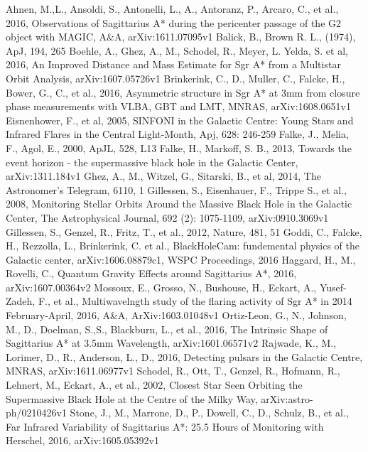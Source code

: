 \documentclass[a4paper,12pt]{article}
\begin{document}
\begin{thebibliography}{1}
Ahnen, M.,L., Ansoldi, S., Antonelli, L., A., Antoranz, P., Arcaro, C., et al., 2016, Observations of Sagittarius A* during the pericenter passage of the G2 object with 
MAGIC, A\&A, arXiv:1611.07095v1
Balick, B., Brown R. L., (1974), ApJ, 194, 265
Boehle, A., Ghez, A., M., Schodel, R., Meyer, L. Yelda, S. et al, 2016, An Improved Distance and Mass Estimate for Sgr A* from a Multistar Orbit Analysis, 
arXiv:1607.05726v1
Brinkerink, C., D., Muller, C., Falcke, H., Bower, G., C., et al., 2016, Asymmetric structure in Sgr A* at 3mm from closure phase measurements with VLBA,
 GBT and LMT, MNRAS, arXiv:1608.0651v1
Eisnenhower, F., et al, 2005, SINFONI in the Galactic Centre: Young Stars and Infrared Flares in the Central Light-Month, Apj, 628: 246-259
Falke, J., Melia, F., Agol, E., 2000, ApJL, 528, L13
Falke, H., Markoff, S. B., 2013, Towards the event horizon - the supermassive black hole in the Galactic Center, arXiv:1311.184v1
Ghez, A., M., Witzel, G., Sitarski, B., et al, 2014, The Astronomer's Telegram, 6110, 1
Gillessen, S., Eisenhauer, F., Trippe S., et al., 2008, Monitoring Stellar Orbits Around the Massive Black Hole in the Galactic Center, The Astrophysical
 Journal, 692 (2): 1075-1109, arXiv:0910.3069v1
Gillessen, S., Genzel, R., Fritz, T., et al., 2012, Nature, 481, 51
Goddi, C., Falcke, H., Rezzolla, L., Brinkerink, C. et al., BlackHoleCam: fundemental physics of the Galactic center, arXiv:1606.08879c1, WSPC Proceedings, 2016 
Haggard, H., M., Rovelli, C., Quantum Gravity Effects around Sagittarius A*, 2016, arXiv:1607.00364v2
Mossoux, E., Grosso, N., Bushouse, H., Eckart, A., Yusef-Zadeh, F., et al., Multiwavelngth study of the flaring activity of Sgr A* in 2014 February-April, 2016,
A\&A, ArXiv:1603.01048v1
Ortiz-Leon, G., N., Johnson, M., D., Doelman, S.,S., Blackburn, L., et al., 2016, The Intrinsic Shape of Sagittarius A* at 3.5mm Wavelength, arXiv:1601.06571v2
Rajwade, K., M., Lorimer, D., R., Anderson, L., D., 2016, Detecting pulsars in the Galactic Centre, MNRAS, arXiv:1611.06977v1
Schodel, R., Ott, T., Genzel, R., Hofmann, R., Lehnert, M., Eckart, A., et al., 2002, Closest Star Seen Orbiting the Supermassive Black Hole at the Centre of the 
Milky Way, arXiv:astro-ph/0210426v1
Stone, J., M., Marrone, D., P., Dowell, C., D., Schulz, B., et al., Far Infrared Variability of Sagittarius A*: 25.5 Hours of Monitoring with Herschel, 2016,
 arXiv:1605.05392v1
\end{thebibliography}
\end{document}
